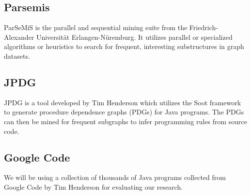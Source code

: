 \documentclass[12pt]{article}
\begin{document}
\subsection{Parsemis}
ParSeMiS is the parallel and sequential mining suite from the Friedrich-Alexander Universit{\"a}t Erlangen-N{\"u}remburg. It utilizes parallel or specialized algorithms or heuristics to search for frequent, interesting substructures in graph datasets.
\subsection{JPDG}
\label{subsection:JPDG}
JPDG is a tool developed by Tim Henderson which utilizes the Soot framework to generate procedure dependence graphs (PDGs) for Java programs. The PDGs can then be mined for frequent subgraphs to infer programming rules from source code.
\subsection{Google Code}
We will be using a collection of thousands of Java programs collected from Google Code by Tim Henderson for evaluating our research.
\pagebreak


\end{document}
